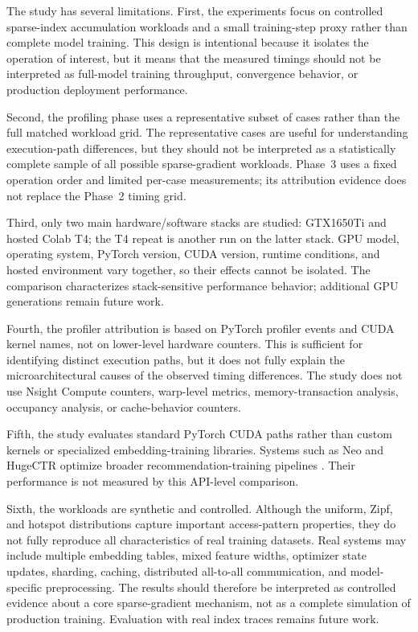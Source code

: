 The study has several limitations. First, the experiments focus on controlled sparse-index accumulation workloads and a small training-step proxy rather than complete model training. This design is intentional because it isolates the operation of interest, but it means that the measured timings should not be interpreted as full-model training throughput, convergence behavior, or production deployment performance.

Second, the profiling phase uses a representative subset of cases rather than the full matched workload grid. The representative cases are useful for understanding execution-path differences, but they should not be interpreted as a statistically complete sample of all possible sparse-gradient workloads. Phase~3 uses a fixed operation order and limited per-case measurements; its attribution evidence does not replace the Phase~2 timing grid.

Third, only two main hardware/software stacks are studied: GTX1650Ti and hosted Colab T4; the T4 repeat is another run on the latter stack. GPU model, operating system, PyTorch version, CUDA version, runtime conditions, and hosted environment vary together, so their effects cannot be isolated. The comparison characterizes stack-sensitive performance behavior; additional GPU generations remain future work.

Fourth, the profiler attribution is based on PyTorch profiler events and CUDA kernel names, not on lower-level hardware counters. This is sufficient for identifying distinct execution paths, but it does not fully explain the microarchitectural causes of the observed timing differences. The study does not use Nsight Compute counters, warp-level metrics, memory-transaction analysis, occupancy analysis, or cache-behavior counters.

Fifth, the study evaluates standard PyTorch CUDA paths rather than custom kernels or specialized embedding-training libraries. Systems such as Neo and HugeCTR optimize broader recommendation-training pipelines \citep{mudigere2022neo,wang2022hugectr}. Their performance is not measured by this API-level comparison.

Sixth, the workloads are synthetic and controlled. Although the uniform, Zipf, and hotspot distributions capture important access-pattern properties, they do not fully reproduce all characteristics of real training datasets. Real systems may include multiple embedding tables, mixed feature widths, optimizer state updates, sharding, caching, distributed all-to-all communication, and model-specific preprocessing. The results should therefore be interpreted as controlled evidence about a core sparse-gradient mechanism, not as a complete simulation of production training. Evaluation with real index traces remains future work.

